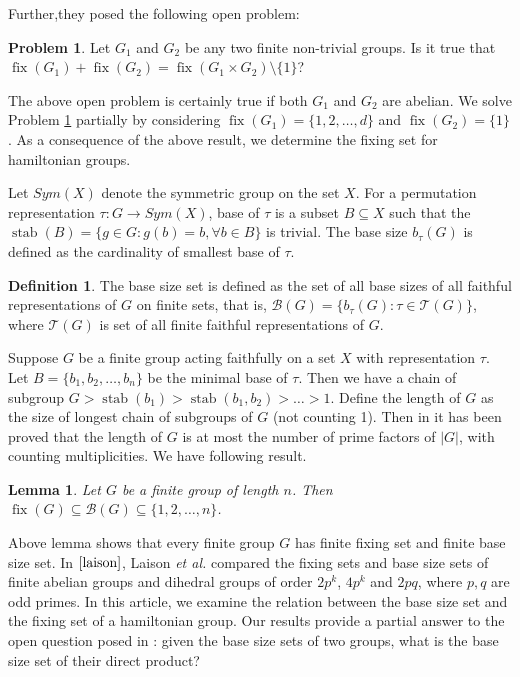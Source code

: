 \documentclass[12pt]{article}
\theoremstyle{plain}
\newtheorem{lemma}[theorem]{Lemma}
\theoremstyle{definition}
\newtheorem{definition}[theorem]{Definition}
\newtheorem{problem}[theorem]{Problem}
\newcommand{\stab}{\mathop{\mathrm{stab}}}
\newcommand{\fix}{\mathop{\mathrm{fix}}}
\begin{document}
	Further,they posed the following open problem:	\begin{problem}\cite{jdl}
		\label{fix_op1}
		Let $G_1$ and $G_2$ be any two finite non-trivial groups. Is it true that $\fix(G_1) +
		\fix(G_2) = \fix(G_1 \times G_2)\setminus\{1\}$?
	\end{problem}
	The above open problem is certainly true if both $G_1$ and $G_2$ are abelian. We solve Problem \ref{fix_op1} partially by considering $\fix(G_1)=\{1,2,\ldots,d\}$ and $\fix(G_2)=\{1\}$. As a consequence of the above result, we determine the fixing set for hamiltonian groups. 
	
	Let $Sym(X)$ denote the symmetric group on the set $X$. For a permutation representation $\tau : G \to Sym(X)$, base of $\tau$ is a subset $B \subseteq X$ such that the $\stab(B) = \{g \in G : g(b) = b, \forall b \in B\}$ is trivial. The base size $b_{\tau}(G)$ is defined as the cardinality of smallest base of $\tau$. 
	 
	 	\begin{definition}
	 	The base size set is defined as the set of all base sizes of all faithful representations of $G$ on finite sets, that is, $\mathcal{B}(G) = \{ b_{\tau}(G) : \tau \in \mathcal{T}(G)\}$, where $\mathcal{T}(G)$ is set of all finite faithful representations of $G$.
	 \end{definition}
	 
	 	Suppose $G$ be a finite group acting faithfully on a set $X$ with representation $\tau$. Let $B = \{b_{1}, b_{2}, \ldots,b_{n}\}$ be the minimal base of $\tau$. Then we have a chain of subgroup $G > \stab(b_{1}) > \stab(b_{1},b_{2}) > \ldots > 1$. Define the length of $G$ as the size of longest chain of subgroups of $G$ (not counting 1). Then in \cite{cameron} it has been proved that the length of $G$ is at most the number of prime factors of $|G|$, with counting multiplicities. We have following result.
	 \begin{lemma}
	 	\label{base_len}
	 Let $G$ be a finite group of length $n$. Then $\fix(G) \subseteq \mathcal{B}(G) \subseteq \{1,2,\ldots,n\}$.
	 \end{lemma}
	 Above lemma shows that every finite group $G$ has finite fixing set and finite base size set. In $\cite{laison}$, Laison \emph{et al.} compared the fixing sets and base size sets of finite abelian groups and dihedral groups of order $2p^{k}$, $4p^{k}$ and $2pq$, where $p,q$ are odd primes. In this article, we examine the relation between the base size set and the fixing set of a hamiltonian group. Our results provide a partial answer to the open question posed in \cite{laison}: given the base size sets of two groups, what is the base size set of their direct product?
	
\end{document}
